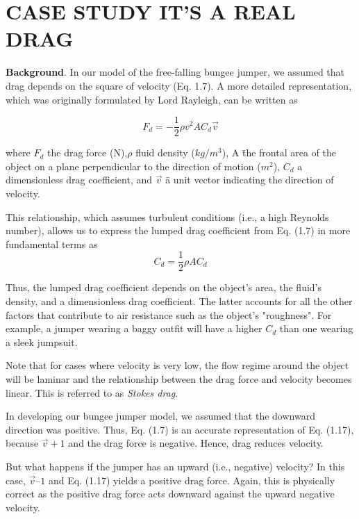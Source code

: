 \documentclass[../main.tex]{subfiles}
\begin{document}
\section*{\textbf{CASE STUDY} IT'S A REAL DRAG}

\textbf{Background}. In our model of the free-falling bungee jumper, we assumed that drag
depends on the square of velocity (Eq. 1.7). A more detailed representation, which was
originally formulated by Lord Rayleigh, can be written as

\begin{equation}
	\tag{1.17}
	F_d =-\dfrac{1}{2}\rho v^2AC_d\overrightarrow{v} 
\end{equation}

where $F_d$  the drag force (N),$\rho$   fluid density ($kg/m^3$), A \= the frontal area of the object
on a plane perpendicular to the direction of motion ($m^2$), $C_d$  a dimensionless drag coefficient, 
and $\overrightarrow{v}$  \=  a unit vector indicating the direction of velocity.


This relationship, which assumes turbulent conditions (i.e., a high Reynolds number),
allows us to express the lumped drag coefficient from Eq. (1.7) in more fundamental terms
as
\begin{equation}
	\tag{1.18}
	C_d=\dfrac{1}{2}\rho AC_d
\end{equation}

Thus, the lumped drag coefficient depends on the object's area, the fluid's density, and a
dimensionless drag coefficient. The latter accounts for all the other factors that contribute
to air resistance such as the object's "roughness". For example, a jumper wearing a baggy
outfit will have a higher $C_d$ than one wearing a sleek jumpsuit.

Note that for cases where velocity is very low, the flow regime around the object will
be laminar and the relationship between the drag force and velocity becomes linear. This is
referred to as \textsl{Stokes drag}.

In developing our bungee jumper model, we assumed that the downward direction was
positive. Thus, Eq. (1.7) is an accurate representation of Eq. (1.17), because $\overrightarrow{v} + 1$    and
the drag force is negative. Hence, drag reduces velocity.


But what happens if the jumper has an upward (i.e., negative) velocity? In this case,
$\overrightarrow{v} –1$ and Eq. (1.17) yields a positive drag force. Again, this is physically correct as the positive 
drag force acts downward against the upward negative velocity.
\end{document}

